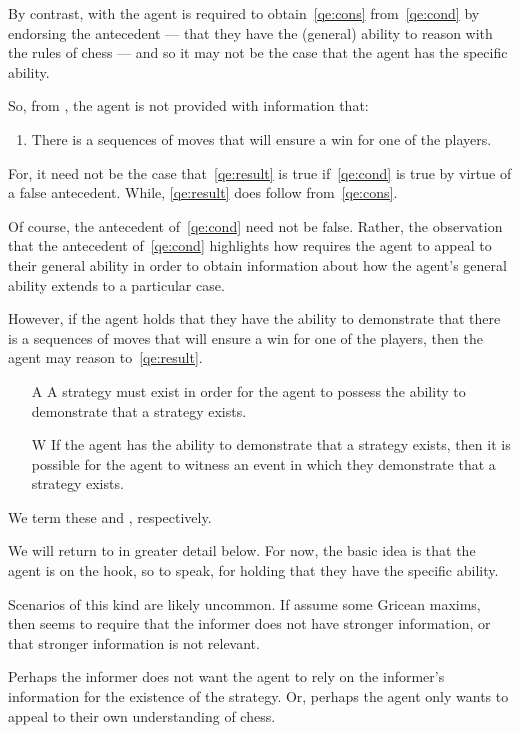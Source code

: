 \begin{note}
  By contrast, with \GSI{} the agent is required to obtain~\ref{qe:cons} from~\ref{qe:cond} by endorsing the antecedent --- that they have the (general) ability to reason with the rules of chess --- and so it may not be the case that the agent has the specific ability.

  So, from \GSI{}, the agent is not provided with information that:
  \begin{enumerate}[label=(I\arabic*), ref=(I\arabic*), resume]
  \item\label{qe:result} There is a sequences of moves that will ensure a win for one of the players.
  \end{enumerate}
  For, it need not be the case that~\ref{qe:result} is true if~\ref{qe:cond} is true by virtue of a false antecedent.
  While, \ref{qe:result} does follow from~\ref{qe:cons}.

  Of course, the antecedent of~\ref{qe:cond} need not be false.
  Rather, the observation that the antecedent of~\ref{qe:cond} highlights how \GSI{} requires the agent to appeal to their general ability in order to obtain information about how the agent's general ability extends to a particular case.

  However, if the agent holds that they have the ability to demonstrate that there is a sequences of moves that will ensure a win for one of the players, then the agent may reason to~\ref{qe:result}.

  \begin{enumerate}
  \item[\textsf{A}]\label{A:s} A strategy must exist in order for the agent to possess the ability to demonstrate that a strategy exists.
  \item[\textsf{W}]\label{W:s} If the agent has the ability to demonstrate that a strategy exists, then it is possible for the agent to witness an event in which they demonstrate that a strategy exists.
  \end{enumerate}
  We term these \AR{} and \WR{}, respectively.

  We will return to \GSI in greater detail below.
  For now, the basic idea is that the agent is on the hook, so to speak, for holding that they have the specific ability.

  Scenarios of this kind are likely uncommon.
  If assume some Gricean maxims, then seems to require that the informer does not have stronger information, or that stronger information is not relevant.

  Perhaps the informer does not want the agent to rely on the informer's information for the existence of the strategy.
  Or, perhaps the agent only wants to appeal to their own understanding of chess.


\end{note}

